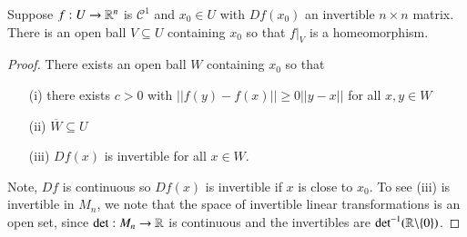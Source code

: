 \begin{lemma}
    Suppose $f:U\rightarrow \mathbb R^n$ is $\mathcal{C}^1$ and $x_0 \in U$ with $Df(x_0)$ an invertible $n\times n$ matrix. There is an open ball $V \subseteq U$ containing $x_0$ so that $f\vert_V$ is a homeomorphism.
\end{lemma}
\begin{proof}
    There exists an open ball $W$ containing $x_0$ so that \begin{itemize}
        \item[(i)] there exists $c > 0$ with $||f(y) - f(x)|| \geq 0||y-x||$ for all $x,y \in W$
        \item[(ii)] $\overline{W} \subseteq U$ 
        \item[(iii)] $Df(x)$ is invertible for all $x \in W$.
    \end{itemize}
    Note, $Df$ is continuous so $Df(x)$ is invertible if $x$ is close to $x_0$. To see (iii) is invertible in $M_n$, we note that the space of invertible linear transformations is an open set, since $\det:M_n\rightarrow \mathbb R$ is continuous and the invertibles are $\det^{-1}(\mathbb R\backslash\{0\})$. 


\end{proof}
